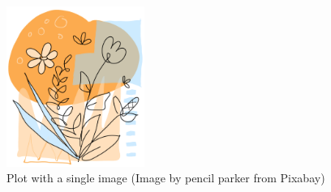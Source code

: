 \begin{figure}[htbp]
\centering
\includegraphics[width=0.4\textwidth]{Chapters/Chapter_2/figures/image2_2.PNG}
\caption{Plot with a single image (Image by pencil parker from Pixabay)}
\label{fig:figure2_2}
\end{figure}